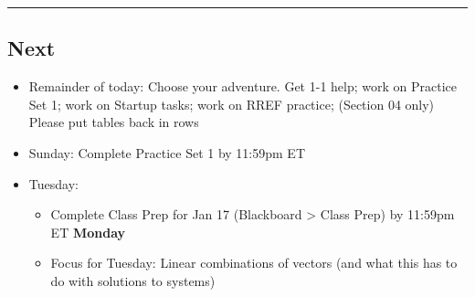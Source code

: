 \documentclass[
  letterpaper,
  DIV=11,
  numbers=noendperiod]{scrartcl}
\providecommand{\tightlist}{%
  \setlength{\itemsep}{0pt}\setlength{\parskip}{0pt}}\usepackage{longtable,booktabs,array}
\begin{document}
\begin{center}\rule{0.5\linewidth}{0.5pt}\end{center}

\hypertarget{next}{%
\subsection{Next}\label{next}}

\begin{itemize}
\tightlist
\item
  Remainder of today: Choose your adventure. Get 1-1 help; work on
  Practice Set 1; work on Startup tasks; work on RREF practice; (Section
  04 only) Please put tables back in rows
\item
  Sunday: Complete Practice Set 1 by 11:59pm ET
\item
  Tuesday:

  \begin{itemize}
  \tightlist
  \item
    Complete Class Prep for Jan 17 (Blackboard \textgreater{} Class
    Prep) by 11:59pm ET \textbf{Monday}
  \item
    Focus for Tuesday: Linear combinations of vectors (and what this has
    to do with solutions to systems)
  \end{itemize}
\end{itemize}
\end{document}
